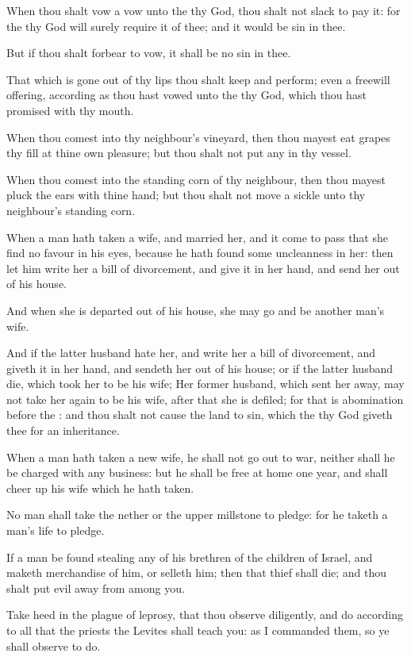 \Verse When thou shalt vow a vow unto the \LORD thy God, thou shalt not slack to pay it: for the \LORD thy God will surely require it of thee; and it would be sin in thee.

\Verse But if thou shalt forbear to vow, it shall be no sin in thee.

\Verse That which is gone out of thy lips thou shalt keep and perform; even a freewill offering, according as thou hast vowed unto the \LORD thy God, which thou hast promised with thy mouth.

\Verse When thou comest into thy neighbour's vineyard, then thou mayest eat grapes thy fill at thine own pleasure; but thou shalt not put any in thy vessel.

\Verse When thou comest into the standing corn of thy neighbour, then thou mayest pluck the ears with thine hand; but thou shalt not move a sickle unto thy neighbour's standing corn.


\Chapter
\Verse When a man hath taken a wife, and married her, and it come to pass that she find no favour in his eyes, because he hath found some uncleanness in her: then let him write her a bill of divorcement, and give it in her hand, and send her out of his house.

\Verse And when she is departed out of his house, she may go and be another man's wife.

\Verse And if the latter husband hate her, and write her a bill of divorcement, and giveth it in her hand, and sendeth her out of his house; or if the latter husband die, which took her to be his wife; \Verse Her former husband, which sent her away, may not take her again to be his wife, after that she is defiled; for that is abomination before the \LORD: and thou shalt not cause the land to sin, which the \LORD thy God giveth thee for an inheritance.

\Verse When a man hath taken a new wife, he shall not go out to war, neither shall he be charged with any business: but he shall be free at home one year, and shall cheer up his wife which he hath taken.

\Verse No man shall take the nether or the upper millstone to pledge: for he taketh a man's life to pledge.

\Verse If a man be found stealing any of his brethren of the children of Israel, and maketh merchandise of him, or selleth him; then that thief shall die; and thou shalt put evil away from among you.

\Verse Take heed in the plague of leprosy, that thou observe diligently, and do according to all that the priests the Levites shall teach you: as I commanded them, so ye shall observe to do.


